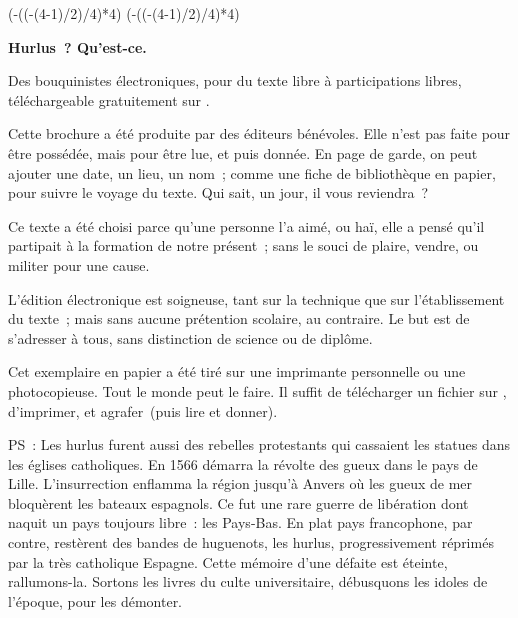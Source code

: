\documentclass[french,twoside]{book} %
\def\truncdiv#1#2{((#1-(#2-1)/2)/#2)}
\def\moduloop#1#2{(#1-\truncdiv{#1}{#2}*#2)}
\def\modulo#1#2{\number\numexpr\moduloop{#1}{#2}\relax}
\begin{document}
\ifbooklet
  \pagestyle{empty}
  \clearpage
  \ifnum\modulo{\value{page}}{4}=0 \hbox{}\newpage\hbox{}\newpage\fi
  \ifnum\modulo{\value{page}}{4}=1 \hbox{}\newpage\hbox{}\newpage\fi


  \hbox{}\newpage
  \ifodd\value{page}\hbox{}\newpage\fi
  {\centering\color{rubric}\bfseries\noindent\large
    Hurlus ? Qu’est-ce.\par
    \bigskip
  }
  \noindent Des bouquinistes électroniques, pour du texte libre à participations libres,
  téléchargeable gratuitement sur \href{https://hurlus.fr}{}.\par
  \bigskip
  \noindent Cette brochure a été produite par des éditeurs bénévoles.
  Elle n’est pas faite pour être possédée, mais pour être lue, et puis donnée.
  En page de garde, on peut ajouter une date, un lieu, un nom ;
  comme une fiche de bibliothèque en papier,
  pour suivre le voyage du texte. Qui sait, un jour, il vous reviendra ?
  \par

  Ce texte a été choisi parce qu’une personne l’a aimé,
  ou haï, elle a pensé qu’il partipait à la formation de notre présent ;
  sans le souci de plaire, vendre, ou militer pour une cause.
  \par

  L’édition électronique est soigneuse, tant sur la technique
  que sur l’établissement du texte ; mais sans aucune prétention scolaire, au contraire.
  Le but est de s’adresser à tous, sans distinction de science ou de diplôme.
  \par

  Cet exemplaire en papier a été tiré sur une imprimante personnelle
   ou une photocopieuse. Tout le monde peut le faire.
  Il suffit de
  télécharger un fichier sur \href{https://hurlus.fr}{},
  d’imprimer, et agrafer (puis lire et donner).\par

  \bigskip

  \noindent PS : Les hurlus furent aussi des rebelles protestants qui cassaient les statues dans les églises catholiques. En 1566 démarra la révolte des gueux dans le pays de Lille. L’insurrection enflamma la région jusqu’à Anvers où les gueux de mer bloquèrent les bateaux espagnols.
  Ce fut une rare guerre de libération dont naquit un pays toujours libre : les Pays-Bas.
  En plat pays francophone, par contre, restèrent des bandes de huguenots, les hurlus, progressivement réprimés par la très catholique Espagne.
  Cette mémoire d’une défaite est éteinte, rallumons-la. Sortons les livres du culte universitaire, débusquons les idoles de l’époque, pour les démonter.
\fi
\end{document}
